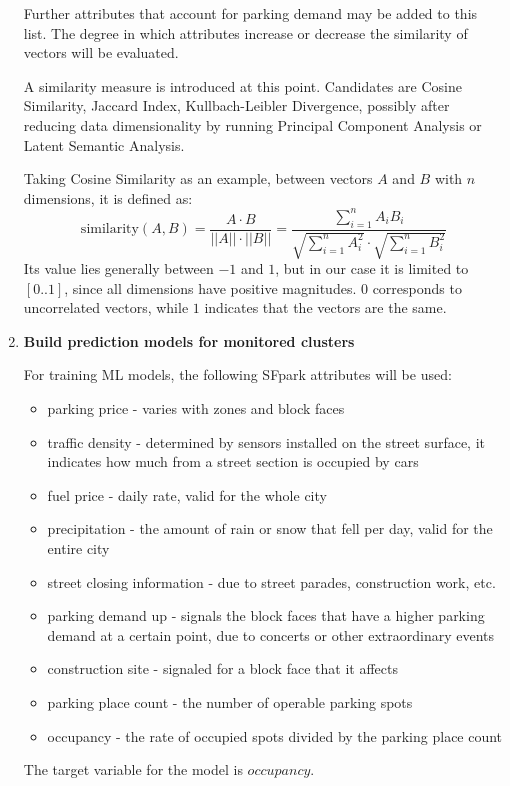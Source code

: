\documentclass{article}
\begin{document}
\begin{large}
\begin{enumerate}
Further attributes that account for parking demand may be added to this list. The degree in which attributes increase or decrease the similarity of vectors will be evaluated.

A similarity measure is introduced at this point. Candidates are Cosine Similarity, Jaccard Index, Kullbach-Leibler Divergence, possibly after reducing data dimensionality by running Principal Component Analysis or Latent Semantic Analysis. 

Taking Cosine Similarity as an example, between vectors $A$ and $B$ with $n$ dimensions, it is defined as:
$$ \text{similarity}(A,B) = \frac{A \cdot B}{||A|| \cdot ||B||} = \frac{\sum_{i=1}^{n}A_iB_i}{\sqrt{\sum_{i=1}^{n}A_i^2} \cdot \sqrt{\sum_{i=1}^{n}B_i^2}}$$
Its value lies generally between $-1$ and $1$, but in our case it is limited to $[0..1]$, since all dimensions have positive magnitudes. $0$ corresponds to uncorrelated vectors, while $1$ indicates that the vectors are the same.

\item \textbf{Build prediction models for monitored clusters}

For training ML models, the following SFpark attributes will be used:
\begin{itemize}
\item parking price - varies with zones and block faces
\item traffic density - determined by sensors installed on the street surface, it indicates how much from a street section is occupied by cars
\item fuel price - daily rate, valid for the whole city
\item precipitation - the amount of rain or snow that fell per day, valid for the entire city
\item street closing information - due to street parades, construction work, etc.
\item parking demand up - signals the block faces that have a higher parking demand at a certain point, due to concerts or other extraordinary events
\item construction site - signaled for a block face that it affects
\item parking place count - the number of operable parking spots
\item occupancy - the rate of occupied spots divided by the parking place count
\end{itemize}
The target variable for the model is $occupancy$. 


\end{enumerate}
\end{large}
\end{document}
